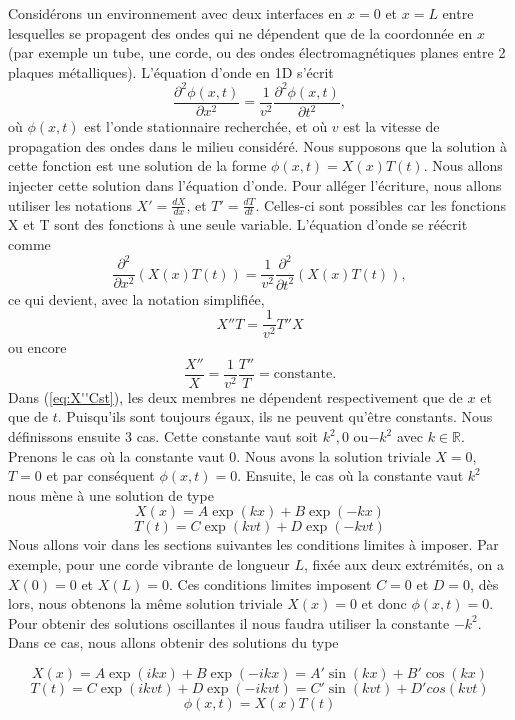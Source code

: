 Considérons un environnement avec deux interfaces en $x=0$ et $x=L$ entre lesquelles se propagent des ondes qui ne dépendent que de la coordonnée en $x$ (par exemple un tube, une corde, ou des ondes électromagnétiques planes entre 2 plaques métalliques). L'équation d'onde en 1D s'écrit 
\[ \frac{\partial^2\phi(x,t)}{\partial x^2} = \frac{1}{v^2}\frac{\partial^2\phi(x,t)}{\partial t^2}, \]
où $\phi(x,t)$ est l'onde stationnaire recherchée, et où $v$ est la vitesse de propagation des ondes dans le milieu considéré. Nous supposons que la solution à cette fonction est une solution de la forme $\phi(x,t)=X(x)T(t)$. Nous allons injecter cette solution dans l'équation d'onde. Pour alléger l'écriture, nous allons utiliser les notations $X'=\frac{dX}{dx}$, et $T'=\frac{dT}{dt}$. Celles-ci sont possibles car les fonctions X et T sont des fonctions à une seule variable. L'équation d'onde se réécrit comme
\[ \frac{\partial^2}{\partial x^2}(X(x)T(t)) = \frac{1}{v^2}\frac{\partial^2}{\partial t^2}(X(x)T(t)), \]
ce qui devient, avec la notation simplifiée, 
\[ X''T=\frac{1}{v^2}T''X\]
ou encore
\begin{equation}
\frac{X''}{X}=\frac{1}{v^2}\frac{T''}{T}=\mbox{constante}.
\label{eq:X''Cst}
\end{equation}
Dans (\ref{eq:X''Cst}), les deux membres ne dépendent respectivement que de $x$ et que de $t$. Puisqu'ils sont toujours égaux, ils ne peuvent qu'être constants. Nous définissons ensuite 3 cas. Cette constante vaut soit $k^2, 0$ ou$-k^2$ avec $k\in \mathbb{R}$.
Prenons le cas où la constante vaut $0$. Nous avons la solution triviale $X=0$, $T=0$ et par conséquent $\phi(x,t)=0$.
Ensuite, le cas où la constante vaut  $k^2$ nous mène à une solution de type
\[X(x)=A\exp(kx)+B\exp(-kx) \]
\[T(t)=C\exp(kvt)+D\exp(-kvt) \]
Nous allons voir dans les sections suivantes les conditions limites à imposer. Par exemple, pour une corde vibrante de longueur $L$, fixée aux deux extrémités, on a $X(0)=0$ et $X(L)=0$. Ces conditions limites imposent $C=0$ et $D=0$, dès lors, nous obtenons la même solution triviale $X(x)=0$ et donc $\phi(x,t)=0$. Pour obtenir des solutions oscillantes il nous faudra utiliser la constante $-k^2$. Dans ce cas, nous allons obtenir des solutions du type 

\[X(x)=A\exp(ikx)+B\exp(-ikx) = A'\sin(kx) + B' \cos(kx)\]
\[T(t)=C\exp(ikvt)+D\exp(-ikvt) = C'\sin(kvt) + D' cos(kvt) \]
\[\phi(x,t) = X(x) T(t)\]%

